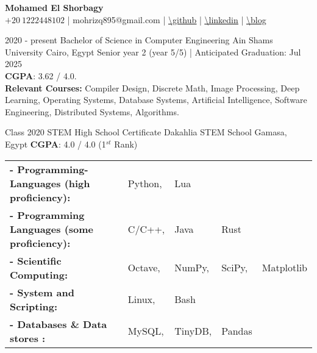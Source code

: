 \documentclass[hidelinks]{report}
\begin{document}
\begin{center}
    \noindent \Huge{ \selectfont \bfseries Mohamed El Shorbagy}\\[.4em]
    \large
    $+20 \ 1222448102$           |
    mohrizq895@gmail.com         | 
    \underline{\url{\github}}    |
    \underline{\url{\linkedin}}  |
    \underline{\url{\blog}}  
\end{center}


\vspace{2mm}

\large 
{}

\entry
    {2020 - present} 
    {Bachelor of Science in Computer Engineering }
    {Ain Shams University}
    {Cairo, Egypt  }
    {\textbullet Senior year 2 (year 5/5) | Anticipated Graduation: Jul 2025 \\ 
     \textbullet \textbf{CGPA}: 3.62 / 4.0. \\  
     \textbullet \textbf{Relevant Courses:} Compiler Design, Discrete Math, Image Processing, Deep Learning,
     Operating Systems, Database Systems, Artificial Intelligence, Software Engineering, Distributed Systems, 
     Algorithms. 
    }  

\entry
    {Class 2020}
    {STEM High School Certificate}
    {Dakahlia STEM School}
    {Gamasa, Egypt}
    {
    \textbullet \textbf{CGPA}: 4.0 / 4.0 (1$^{st}$ Rank)
    }

\vspace{2mm}



\begin{tabular}{ l l l l l}
      \bf{- Programming-Languages (high proficiency):} & Python, & Lua \\ 
      \bf{- Programming Languages (some proficiency):} & C/C++, & Java & Rust \\ 
      \bf{- Scientific Computing:} & Octave, & NumPy, & SciPy, & Matplotlib \\ 
      \bf{- System and Scripting:} & Linux, & Bash \\ 
      \bf{- Databases \& Data stores :} & MySQL, & TinyDB, & Pandas \\ 
       
\end{tabular}

\vspace{4mm}

\end{document}
